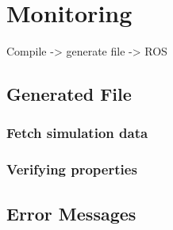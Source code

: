 \chapter{Monitoring}
\label{chap:monitoring}

Compile -> generate file -> ROS

\section{Generated File}

\subsection{Fetch simulation data}

\subsection{Verifying properties}

\section{Error Messages}